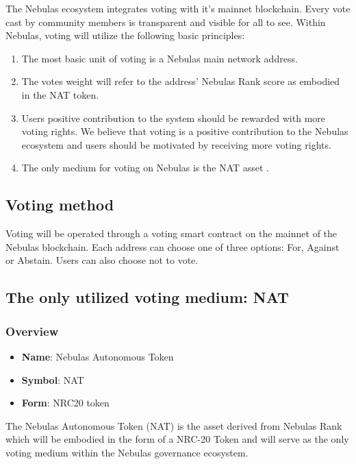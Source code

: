The Nebulas ecosystem integrates voting with it's mainnet blockchain. Every vote cast by community members is transparent and visible for all to see. Within Nebulas, voting will utilize the following basic principles:

\begin{enumerate}
	\item The most basic unit of voting is a Nebulas main network address.
	\item The votes weight will refer to the address' Nebulas Rank score as embodied in the NAT token.
	\item Users positive contribution to the system should be rewarded with more voting rights. We believe that voting  is a positive contribution to the Nebulas ecosystem and users should be motivated by receiving more voting rights.
	\item The only medium for voting on Nebulas is the NAT asset .
\end{enumerate}

\subsection{Voting method}

Voting will be operated through a voting smart contract on the mainnet of the Nebulas blockchain. Each address can choose one of three options: For, Against or Abstain. Users can also choose not to vote.

\subsection{The only utilized voting medium: NAT}

\label{nat}

\subsubsection{Overview}

\begin{itemize}
	\item \textbf{Name}: Nebulas Autonomous Token
	\item \textbf{Symbol}: NAT
	\item \textbf{Form}: NRC20 token
\end{itemize}

The Nebulas Autonomous Token (NAT) is the asset derived from Nebulas Rank which will be embodied in the form of a NRC-20 Token and will serve as the only voting medium within the Nebulas governance ecosystem.

